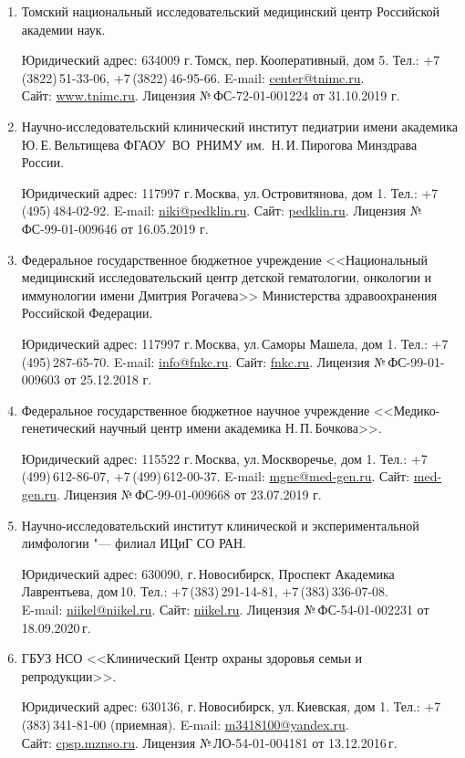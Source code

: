 \documentclass[a4paper,14pt]{extarticle}
\begin{document}
\begin{enumerate}
\item Томский национальный исследовательский медицинский центр Российской академии наук.

Юридический адрес: 634009 г.\,Томск, пер.\,Кооперативный, дом 5.
Тел.: +7\,(3822)\,51-33-06, +7\,(3822)\,46-95-66.
E-mail: \href{mailto:center@tnimc.ru}{center@tnimc.ru}.\\
Сайт: \href{http://www.tnimc.ru}{www.tnimc.ru}.
Лицензия №\,ФС-72-01-001224 от 31.10.2019 г.

\item Научно-исследовательский клинический институт педиатрии имени академика Ю.\,Е.\,Вельтищева ФГАОУ~ВО~РНИМУ им.~Н.\,И.\,Пирогова Минздрава России.

Юридический адрес: 117997 г.\,Москва, ул.\,Островитянова, дом 1.
Тел.: +7\,(495)\,484-02-92.
E-mail: \href{mailto:niki@pedklin.ru}{niki@pedklin.ru}.
Сайт: \href{http://pedklin.ru/}{pedklin.ru}.
Лицензия №\,ФС-99-01-009646 от 16.05.2019 г.

\item Федеральное государственное бюджетное учреждение <<Национальный медицинский исследовательский центр детской гематологии, онкологии и иммунологии имени Дмитрия Рогачева>> Министерства здравоохранения Российской Федерации.

Юридический адрес: 117997 г.\,Москва, ул.\,Саморы Машела, дом 1.
Тел.: +7\,(495)\,287-65-70.
E-mail: \href{mailto:info@fnkc.ru}{info@fnkc.ru}.
Сайт: \href{https://fnkc.ru/}{fnkc.ru}.
Лицензия №\,ФС-99-01-009603 от 25.12.2018 г.

\item Федеральное государственное бюджетное научное учреждение <<Медико-генетический научный центр имени академика Н.\,П.\,Бочкова>>.

Юридический адрес: 115522 г.\,Москва, ул.\,Москворечье, дом 1.
Тел.: +7\,(499)\,612-86-07, +7\,(499)\,612-00-37.
E-mail: \href{mailto:mgnc@med-gen.ru}{mgnc@med-gen.ru}.
Сайт: \href{https://med-gen.ru/}{med-gen.ru}.
Лицензия №\,ФС-99-01-009668 от 23.07.2019 г.

\item Научно-исследовательский институт клинической и экспериментальной лимфологии "--- филиал ИЦиГ СО РАН.

Юридический адрес: 630090, г.\,Новосибирск, Проспект Академика Лаврентьева, дом\,10.
Тел.: +7\,(383)\,291-14-81, +7\,(383)\,336-07-08.\\
E-mail: \href{mailto:niikel@niikel.ru}{niikel@niikel.ru}.
Сайт: \href{http://niikel.ru}{niikel.ru}.
Лицензия №\,ФС-54-01-002231 от 18.09.2020\,г.

\item ГБУЗ НСО <<Клинический Центр охраны здоровья семьи и репродукции>>.

Юридический адрес: 630136, г.\,Новосибирск, ул.\,Киевская, дом 1.
Тел.: +7\,(383)\,341-81-00 (приемная).
E-mail: \href{mailto:m3418100@yandex.ru}{m3418100@yandex.ru}.\\
Сайт: \href{https://cpsp.mznso.ru}{cpsp.mznso.ru}.
Лицензия №\,ЛО-54-01-004181 от 13.12.2016\,г.
\end{enumerate}
\end{document}

